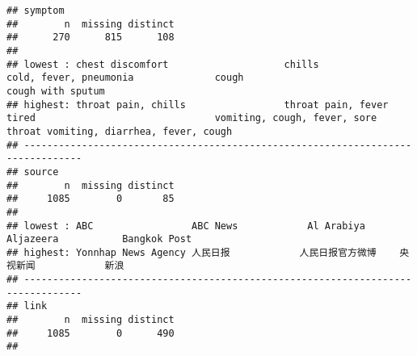 \documentclass[
]{article}
\begin{document}
\begin{verbatim}
## symptom 
##        n  missing distinct 
##      270      815      108 
## 
## lowest : chest discomfort                    chills                              cold, fever, pneumonia              cough                               cough with sputum                  
## highest: throat pain, chills                 throat pain, fever                  tired                               vomiting, cough, fever, sore throat vomiting, diarrhea, fever, cough   
## --------------------------------------------------------------------------------
## source 
##        n  missing distinct 
##     1085        0       85 
## 
## lowest : ABC                 ABC News            Al Arabiya          Aljazeera           Bangkok Post       
## highest: Yonnhap News Agency 人民日报            人民日报官方微博    央视新闻            新浪               
## --------------------------------------------------------------------------------
## link 
##        n  missing distinct 
##     1085        0      490 
## 

\end{verbatim}
\end{document}
